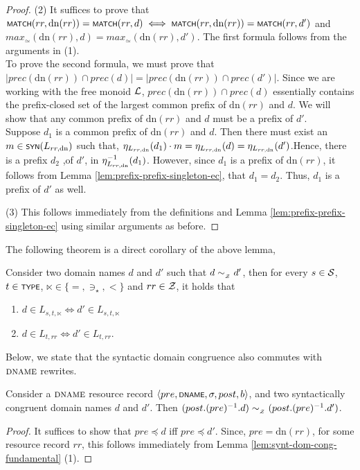 \begin{proof}
	(2) It suffices to prove that $\scrsf{match}(rr,\text{dn}(rr)) = \scrsf{match}(rr,d) \iff \scrsf{match}(rr,\text{dn}(rr)) = \scrsf{match}(rr,d')$ and $max_\simeq(\text{dn}(rr), d) = max_\simeq(\text{dn}(rr), d')$. The first formula follows from the arguments in (1).\\
	To prove the second formula, we must prove that $|prec(\text{dn}(rr)) \cap prec(d)| = |prec(\text{dn}(rr)) \cap prec(d')|$. Since we are working with the free monoid $\cal L$, $prec(\text{dn}(rr)) \cap prec(d)$ essentially contains the prefix-closed set of the largest common prefix of $\text{dn}(rr)$ and $d$. We will show that any common prefix of $\text{dn}(rr)$ and $d$ must be a prefix of $d'$.\\
	Suppose $d_1$ is a common prefix of $\text{dn}(rr)$ and $d$. Then there must exist an $m\in \synmon{L_{rr,\text{dn}}}$ such that, $\synhom{L_{rr,\text{dn}}}(d_1)\cdot m = \synhom{L_{rr,\text{dn}}}(d) = \synhom{L_{rr,\text{dn}}}(d')$.Hence, there is a prefix $d_2$ ,of $d'$, in $\synhom{L_{rr,\text{dn}}}^{-1}(d_1)$. However, since $d_1$ is a prefix of $\text{dn}(rr)$, it follows from Lemma \ref{lem:prefix-prefix-singleton-ec}, that $d_1 = d_2$. Thus, $d_1$ is a prefix of $d'$ as well.
	
	(3) This follows immediately from the definitions and Lemma \ref{lem:prefix-prefix-singleton-ec} using similar arguments as before.
\end{proof}

The following theorem is a direct corollary of the above lemma,
\begin{theorem}
	Consider two domain names $d$ and $d'$ such that $d \simZ d'$, then for every $s\in\cal S$, $t\in\scrsf{type}$, $\ltimes \in \{=,\ni_{\star},<\}$ and $rr\in \cal Z$, it holds that
	\begin{enumerate}
		\item $d \in L_{s,t,\ltimes} \iff d' \in L_{s,t,\ltimes}$
		\item $d \in L_{t,rr} \iff d' \in L_{t,rr}$.
	\end{enumerate}
\end{theorem}

Below, we state that the syntactic domain congruence also commutes with $\rtype{DNAME}$ rewrites.
\begin{lemma}
	Consider a $\rtype{DNAME}$ resource record $\tup{pre,\scrsf{dname},\sigma, post,b}$, and two syntactically congruent domain names $d$ and $d'$. Then $(post.(pre)^{-1}.d) \simZ (post . (pre)^{-1} . d')$.
\end{lemma}
\begin{proof}
	It suffices to show that $pre \preceq d$ iff $pre \preceq d'$. Since, $pre = \text{dn}(rr)$, for some resource record $rr$, this follows immediately from Lemma \ref{lem:synt-dom-cong-fundamental} (1).
\end{proof}

